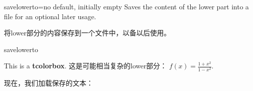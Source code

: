 \begin{docTcbKey}[][doc updated=2014-11-28]{savelowerto}{=}{no default, initially empty}
Saves the content of the lower part into a file for an optional later usage.

将lower部分的内容保存到一个文件中，以备以后使用。
\begin{exdispExample}{savelowerto}
\begin{tcolorbox}[lowerbox=invisible,savelowerto=\jobname_bspsave.tex,colback=white]
This is a \textbf{tcolorbox}.
\tcblower
这是可能相当复杂的lower部分：
$\displaystyle f(x)=\frac{1+x^2}{1-x^2}$.
\end{tcolorbox}

现在，我们加载保存的文本：\\

\end{exdispExample}
\end{docTcbKey}




